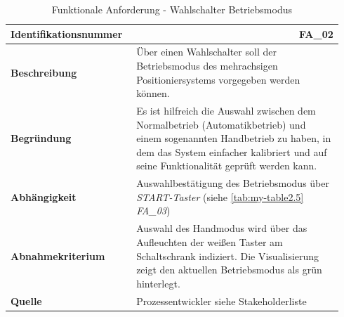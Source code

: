 \documentclass[../../../Bachelorarbeit.tex]{subfiles}
\begin{document}
\begin{table}[H]
    \centering
    \begin{tabular}{ p{0.34\linewidth}  p{0.6\linewidth} }
        \hline
        \textbf{Identifikationsnummer}  & \multicolumn{1}{r}{FA\_02} \\ \hline
        \textbf{Beschreibung}           & Über einen Wahlschalter soll der Betriebsmodus des mehrachsigen Positioniersystems vorgegeben werden können. \\
        \textbf{Begründung}             & Es ist hilfreich die Auswahl zwischen dem Normalbetrieb (Automatikbetrieb) und einem sogenannten Handbetrieb zu haben, in dem das System einfacher kalibriert und auf seine Funktionalität geprüft werden kann. \\
        \textbf{Abhängigkeit}           & Auswahlbestätigung des Betriebsmodus über \textit{START-Taster} (siehe \autoref{tab:my-table2.5} \textit{FA\_03}) \\
        \textbf{Abnahmekriterium}       & Auswahl des Handmodus wird über das Aufleuchten der weißen Taster am Schaltschrank indiziert. Die Visualisierung zeigt den aktuellen Betriebsmodus als grün hinterlegt. \\
        \textbf{Quelle}                 & Prozessentwickler siehe Stakeholderliste \\ \hline
    \end{tabular}
    \caption[\acs{fa} - Wahlschalter Betriebsmodus]{Funktionale Anforderung - Wahlschalter Betriebsmodus}
    \label{tab:my-table2}
\end{table}
\end{document}
